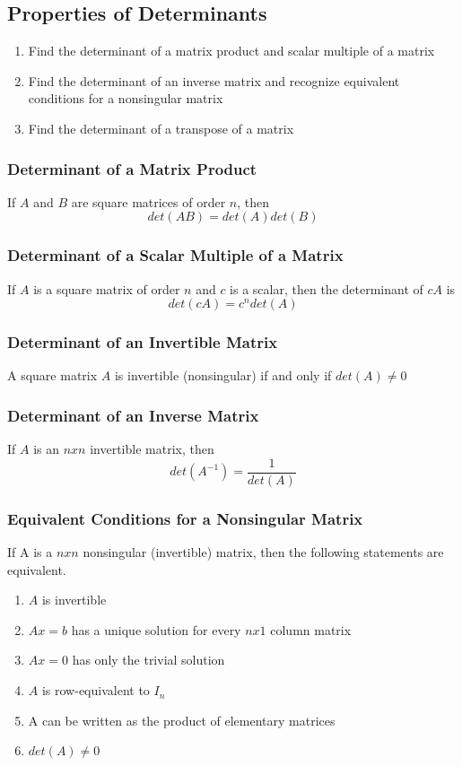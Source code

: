 \documentclass[12pt, letterpaper, twoside]{article}
\begin{document}
\subsection{Properties of Determinants}
\begin{enumerate}
\item Find the determinant of a matrix product and scalar multiple of a matrix
\item Find the determinant of an inverse matrix and recognize equivalent conditions for a nonsingular matrix
\item Find the determinant of a transpose of a matrix
\end{enumerate}

\subsubsection*{Determinant of a Matrix Product}
If $A$ and $B$ are square matrices of order $n$, then
$$det(AB) = det(A)det(B)$$

\subsubsection*{Determinant of a Scalar Multiple of a Matrix}
If $A$ is a square matrix of order $n$ and $c$ is a scalar, then the determinant of $cA$ is 
$$det(cA) = c^ndet(A)$$

\subsubsection*{Determinant of an Invertible Matrix}
A square matrix $A$ is invertible (nonsingular) if and only if $det(A) \neq 0$

\subsubsection*{Determinant of an Inverse Matrix}
If $A$ is an $nxn$ invertible matrix, then 
$$det(A^{-1}) = \frac{1}{det(A)}$$

\subsubsection*{Equivalent Conditions for a Nonsingular Matrix}
If A is a $nxn$ nonsingular (invertible) matrix, then the following statements are equivalent.
\begin{enumerate}
\item $A$ is invertible
\item $Ax=b$ has a unique solution for every $nx1$ column matrix
\item $Ax=0$ has only the trivial solution
\item $A$ is row-equivalent to $I_n$
\item A can be written as the product of elementary matrices
\item $det(A) \neq 0$
\end{enumerate}
\end{document}

